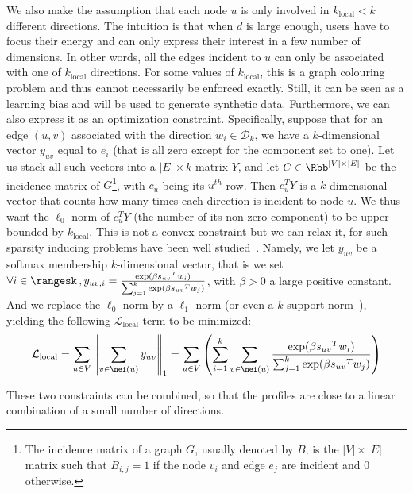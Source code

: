 \bigskip

We also make the assumption that each node $u$ is only involved in $k_\mathrm{local} < k$
different directions. The intuition is that when $d$ is large enough, users have to focus their
energy and can only express their interest in a few number of dimensions. In other words, all the
edges incident to $u$ can only be associated with one of $k_\mathrm{local}$ directions. For
some values of
$k_\mathrm{local}$, this is a \NPc{} graph colouring problem and thus cannot necessarily be enforced
exactly. Still, it can be seen as a learning bias and will be used to generate synthetic data.
Furthermore, we can also express it as an optimization constraint. Specifically, suppose that for
an edge $(u,v)$ associated with the direction $w_i \in \mathcal{D}_k$, we have a $k$-dimensional
vector $y_{uv}$ equal to $e_i$ (that is all zero except for the \ith{} component set to one). Let
us stack all such vectors into a $|E| \times k$ matrix $Y$, and let $C \in \Rbb^{|V| \times |E|}$ be
the incidence matrix of $G$\footnote{The incidence matrix of a graph $G$, usually denoted by $B$, is
the $|V| \times |E|$ matrix such that $B_{i,j} = 1$ if the node $v_i$ and edge $e_j$ are incident
and 0 otherwise.}, with $c_u$ being its $u^{th}$ row. Then $c_u^TY$ is a $k$-dimensional vector that counts
how many times each direction is incident to node $u$. We thus want the $\ell_0$ norm of $c_u^TY$
(\ie the number of its non-zero component) to be upper bounded by $k_\mathrm{local}$.
This is not a convex constraint but we can relax it, for such sparsity inducing problems have been
well studied~\autocite{sparseOptim12}. Namely, we let $y_{uv}$ be a softmax membership
$k$-dimensional vector, that is we set $\forall i \in \rangesk\,, y_{uv,i} =
\frac{\exp(\beta{s_{uv}}^T w_i)}{\sum_{j=1}^k \exp(\beta {s_{uv}}^T w_j)} $, with $\beta>0$ a large
positive constant.  And we replace the $\ell_0$ norm by a $\ell_1$ norm (or even a $k$-support
norm~\autocite{KsupportNorm12}), yielding the following $\mathcal{L}_{\mathrm{local}}$ term to be
minimized:
\begin{equation}
  \label{eq:edge_local_loss}
  \mathcal{L}_{\mathrm{local}} =
  \sum_{u \in V} \left\| \sum_{v \in \nei(u)} y_{uv} \right\|_1 =
  \sum_{u \in V} \left( \sum_{i = 1}^k \sum_{v \in \nei(u)}
  \frac{\exp(\beta{s_{uv}}^T w_i)}{\sum_{j=1}^k \exp(\beta {s_{uv}}^T w_j)} \right)
\end{equation}

These two constraints can be combined, so that the profiles are close to a linear combination of a
small number of directions.

